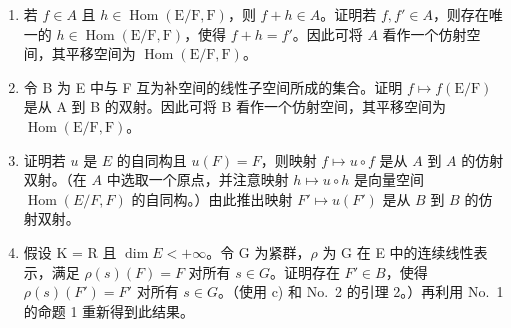 \begin{enumerate}
\def\labelenumi{\alph{enumi})}
\item
  若 \(f \in A\) 且 \(h \in \operatorname{Hom}(\mathrm{E} / \mathrm{F}, \mathrm{F})\)，则 \(f + h \in A\)。证明若 \(f, f' \in A\)，则存在唯一的 \(h \in \operatorname{Hom}(\mathrm{E} / \mathrm{F}, \mathrm{F})\)，使得 \(f + h = f'\)。因此可将 \(A\) 看作一个仿射空间，其平移空间为 \(\operatorname{Hom}(\mathrm{E} / \mathrm{F}, \mathrm{F})\)。
\item
  令 B 为 E 中与 F 互为补空间的线性子空间所成的集合。证明 \(f \mapsto f(\mathrm{E}/\mathrm{F})\) 是从 A 到 B 的双射。因此可将 B 看作一个仿射空间，其平移空间为 \(\operatorname{Hom}(\mathrm{E}/\mathrm{F}, \mathrm{F})\)。
\item
  证明若 \(u\) 是 \(E\) 的自同构且 \(u(F) = F\)，则映射 \(f \mapsto u \circ f\) 是从 \(A\) 到 \(A\) 的仿射双射。（在 \(A\) 中选取一个原点，并注意映射 \(h \mapsto u \circ h\) 是向量空间 \(\operatorname{Hom}(E/F, F)\) 的自同构。）由此推出映射 \(F' \mapsto u(F')\) 是从 \(B\) 到 \(B\) 的仿射双射。
\item
  假设 K = R 且 \(\dim E < +\infty\)。令 G 为紧群，\(\rho\) 为 G 在 E 中的连续线性表示，满足 \(\rho(s)(F) = F\) 对所有 \(s \in G\)。证明存在 \(F' \in B\)，使得 \(\rho(s)(F') = F'\) 对所有 \(s \in G\)。（使用 c) 和 No.~2 的引理 2。）再利用 No.~1 的命题 1 重新得到此结果。
\end{enumerate}

